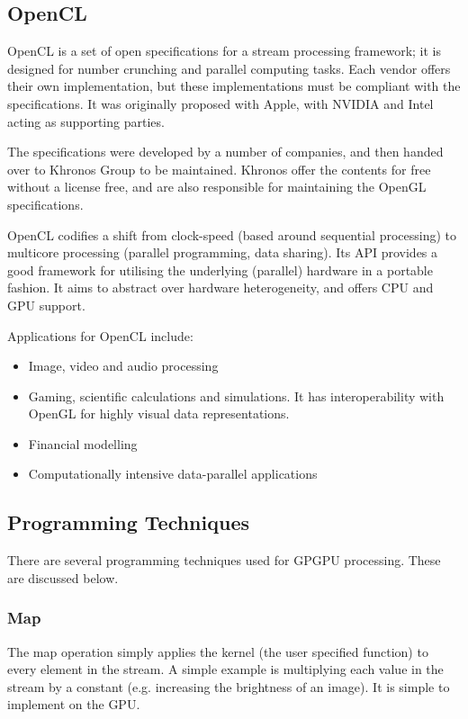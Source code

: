 \subsection{OpenCL}
OpenCL is a set of open specifications for a stream processing framework; it is designed for number crunching and parallel computing tasks. Each vendor offers their own implementation, but these implementations must be compliant with the specifications. It was originally proposed with Apple, with NVIDIA and Intel acting as supporting parties.

The specifications were developed by a number of companies, and then handed over to Khronos Group to be maintained. Khronos offer the contents for free without a license free, and are also responsible for maintaining the OpenGL specifications.

OpenCL codifies a shift from clock-speed (based around sequential processing) to multicore processing (parallel programming, data sharing). Its API provides a good framework for utilising the underlying (parallel) hardware in a portable fashion. It aims to abstract over hardware heterogeneity, and offers CPU and GPU support.

Applications for OpenCL include: \begin{itemize}
\item Image, video and audio processing 
\item Gaming, scientific calculations and simulations. It has interoperability with OpenGL for highly visual data representations.
\item Financial modelling 
\item Computationally intensive data-parallel applications 
\end{itemize}

\subsection{Programming Techniques}
There are several programming techniques used for GPGPU processing. These are discussed below.

\subsubsection{Map}
The map operation simply applies the kernel (the user specified function) to every element in the stream. A simple example is multiplying each value in the stream by a constant (e.g. increasing the brightness of an image). It is simple to implement on the GPU.

